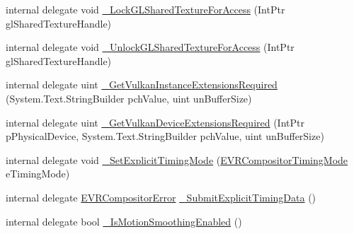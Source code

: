 \begin{DoxyCompactItemize}
\item 
internal delegate void \mbox{\hyperlink{struct_valve_1_1_v_r_1_1_i_v_r_compositor_af32b455cb8d7467ceaed3018cc163bfe}{\+\_\+\+Lock\+G\+L\+Shared\+Texture\+For\+Access}} (Int\+Ptr gl\+Shared\+Texture\+Handle)
\item 
internal delegate void \mbox{\hyperlink{struct_valve_1_1_v_r_1_1_i_v_r_compositor_ad503ea42a467e1498243ff87b76188f0}{\+\_\+\+Unlock\+G\+L\+Shared\+Texture\+For\+Access}} (Int\+Ptr gl\+Shared\+Texture\+Handle)
\item 
internal delegate uint \mbox{\hyperlink{struct_valve_1_1_v_r_1_1_i_v_r_compositor_ab79e60bb33523a61ea4347c37827535f}{\+\_\+\+Get\+Vulkan\+Instance\+Extensions\+Required}} (System.\+Text.\+String\+Builder pch\+Value, uint un\+Buffer\+Size)
\item 
internal delegate uint \mbox{\hyperlink{struct_valve_1_1_v_r_1_1_i_v_r_compositor_ab2e36a8e0528d7f4d66abc820366dba4}{\+\_\+\+Get\+Vulkan\+Device\+Extensions\+Required}} (Int\+Ptr p\+Physical\+Device, System.\+Text.\+String\+Builder pch\+Value, uint un\+Buffer\+Size)
\item 
internal delegate void \mbox{\hyperlink{struct_valve_1_1_v_r_1_1_i_v_r_compositor_acec020845b093a0661c4f86e03fb4390}{\+\_\+\+Set\+Explicit\+Timing\+Mode}} (\mbox{\hyperlink{namespace_valve_1_1_v_r_a9fcb102e844540a2246475933f824463}{E\+V\+R\+Compositor\+Timing\+Mode}} e\+Timing\+Mode)
\item 
internal delegate \mbox{\hyperlink{namespace_valve_1_1_v_r_ac34ee1034fda668ccd45f57676ded81b}{E\+V\+R\+Compositor\+Error}} \mbox{\hyperlink{struct_valve_1_1_v_r_1_1_i_v_r_compositor_a5db66fc4dafe46e41c5cf85bf8d1c719}{\+\_\+\+Submit\+Explicit\+Timing\+Data}} ()
\item 
internal delegate bool \mbox{\hyperlink{struct_valve_1_1_v_r_1_1_i_v_r_compositor_a1a133e0381c30b872f74b12228080e87}{\+\_\+\+Is\+Motion\+Smoothing\+Enabled}} ()
\end{DoxyCompactItemize}
